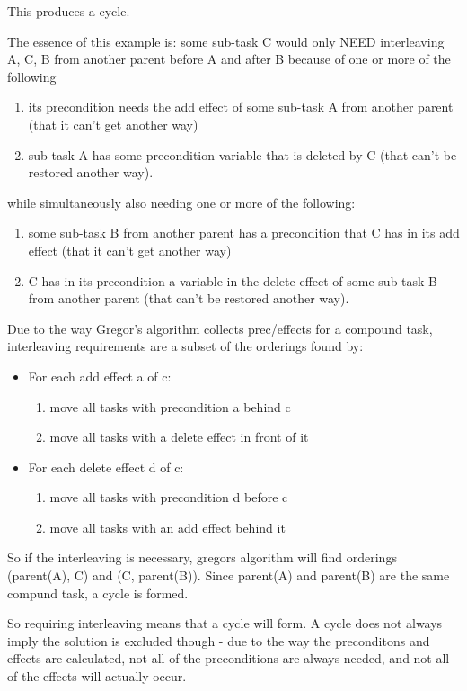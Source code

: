 	This produces a cycle.
	
	The essence of this example is: some sub-task C would only NEED interleaving A, C, B from another parent 
	before A and after B because of one or more of the following
	\begin{enumerate} 
		\item its precondition needs the add effect of some sub-task A from another parent (that it can't get another way)
		\item sub-task A has some precondition variable that is deleted by C (that can't be restored another way).
	\end{enumerate}
     while simultaneously also needing one or more of the following:
	\begin{enumerate} 
		\item some sub-task B from another parent has a precondition that C has in its add effect (that it can't get another way)
		\item C has in its precondition a variable in the delete effect of some sub-task B from another parent (that can't be restored another way).
	\end{enumerate}
		
	 Due to the way Gregor's algorithm collects prec/effects for a compound task, interleaving requirements are a subset of the orderings found by:

\begin{itemize}
	\item For each add effect a of c:
	\begin{enumerate} 
		\item move all tasks with precondition a behind c 
		\item move all tasks with a delete effect in front of it
	\end{enumerate}
	\item For each delete effect d of c:
	\begin{enumerate} 
		\item move all tasks with precondition d before c %
		\item move all tasks with an add effect behind it
	\end{enumerate}
\end{itemize}

	So if the interleaving is necessary, gregors algorithm will find orderings (parent(A), C) and (C, parent(B)). Since parent(A) and parent(B) are the same compund task, a cycle is formed.
	
	So requiring interleaving means that a cycle will form.
	A cycle does not always imply the solution is excluded though - due to the way the preconditons and effects are calculated, not all of the preconditions are always needed,	and not all of the effects will actually occur.
	


